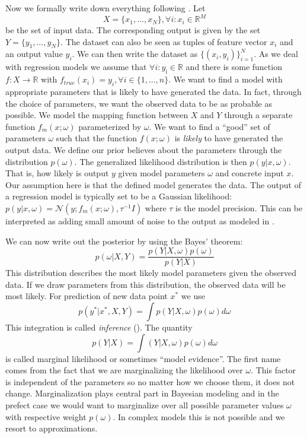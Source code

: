 \documentclass[12pt,a4paper,twoside]{scrartcl}
\numberwithin{equation}{section}
\begin{document}
Now we formally write down everything following \cite{gal2016}. Let
\begin{equation}
  X = \{x_1,\ldots , x_N\}, \forall i : x_i\in\mathbb{R}^M
\end{equation}
be the set of input data. The corresponding output is given by the set \(Y = \{y_1,\ldots , y_N\}\). The dataset can also be seen as tuples of feature vector \(x_i\) and an output value \(y_i\). We can then write the dataset as \(\{ (x_i,y_i)\}_{i=1}^N \). As we deal with regression models we assume that \(\forall i : y_{\text{i}}\in \mathbb{R}\) and there is some function \(f:X \rightarrow\mathbb{R}\) with \(f_{true}(x_i)=y_i, \forall i \in\{1,\ldots , n\}\). We want to find a model with appropriate parameters that is likely to have generated the data. In fact, through the choice of parameters, we want the observed data to be as probable as possible. We model the mapping function between \(X\) and \(Y\) through a separate function \(f_m(x; \omega)\) parameterized by \(\omega\). We want to find a ``good'' set of parameters \(\omega\) such that the function \(f(x;\omega)\) is \emph{likely} to have generated the output data. We define our prior believes about the parameters through the distribution \(p(\omega )\). The generalized likelihood distribution is then \(p(y|x, \omega)\). That is, how likely is output \(y\) given model parameters \(\omega\) and concrete input \(x\). Our assumption here is that the defined model generates the data. The output of a regression model is typically set to be a Gaussian likelihood: \(p(y|x,\omega)=\mathcal{N}(y; f_m(x;\omega), \tau^{-1}I)\) where \(\tau\) is the model precision. This can be interpreted as adding small amount of noise to the output as modeled in \cite{gal2016}.

We can now write out the posterior by using the Bayes' theorem:
\begin{equation}
  p(\omega|X,Y) = \frac{p(Y|X, \omega)p(\omega)}{p(Y|X)}
\end{equation}
This distribution describes the most likely model parameters given the observed data. If we draw parameters from this distribution, the observed data will be most likely. For prediction of new data point \(x^*\) we use
\begin{equation}
  p(y^{\text{*}}|x^{\text{*}},X,Y) = \displaystyle\int p(Y|X, \omega)p(\omega)d \omega
\end{equation}
This integration is called \emph{inference} (\cite{gal2016}). The quantity
\begin{equation}
  p(Y|X) = \displaystyle\int (Y|X, \omega)p( \omega )d \omega
\end{equation}
is called marginal likelihood or sometimes ``model evidence''. The first name comes from the fact that we are marginalizing the likelihood over \(\omega\). This factor is independent of the parameters so no matter how we choose them, it does not change. Marginalization plays central part in Bayesian modeling and in the prefect case we would want to marginalize over all possible parameter values \(\omega\) with respective weight \(p(\omega)\). In complex models this is not possible and we resort to approximations.
\end{document}
